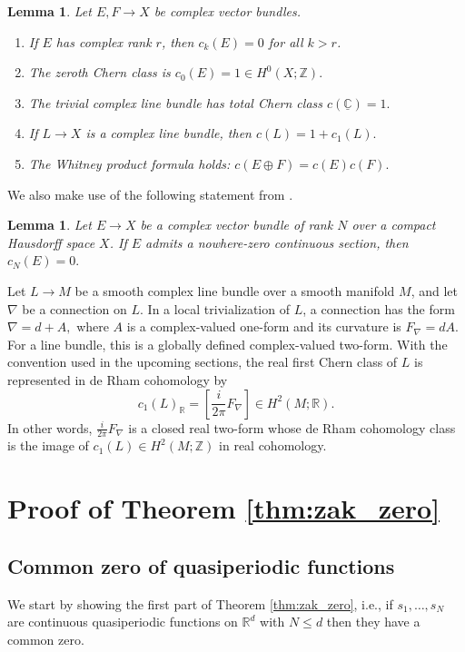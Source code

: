\documentclass[reqno,a4paper,12pt]{amsart}
\numberwithin{equation}{section}
\newtheorem{lemma}[definition]{Lemma}
\def\R{{\mathbb R}}
\newcommand{\Rd}{{\R^d}}
\newcommand\1{\mathds{1}}
\begin{document}
\begin{lemma}
Let $E,F\to X$ be complex vector bundles.
\begin{enumerate}
    \item If $E$ has complex rank $r$, then
    $
    c_k(E)=0
    $
    for all $k > r$.

    \item The zeroth Chern class is
    $
    c_0(E)=1\in H^0(X;\mathbb Z).
    $
    \item The trivial complex line bundle has total Chern class
    $
    c(\underline{\mathbb C})=1.
    $
    \item If $L\to X$ is a complex line bundle, then
    $
    c(L)=1+c_1(L).
    $
    \item The Whitney product formula holds:
    $
    c(E\oplus F)=c(E)c(F).
    $
\end{enumerate}
\end{lemma}

We also make use of the following statement from \cite{milnor1974characteristic}.

\begin{lemma}
Let $E\to X$ be a complex vector bundle of rank $N$ over a compact Hausdorff
space $X$. If $E$ admits a nowhere-zero continuous section, then
$
c_N(E)=0.
$
\end{lemma}

Let $L\to M$ be a smooth complex line bundle over a smooth manifold $M$, and let $\nabla$ be a connection on $L$.
In a local trivialization of $L$, a connection has the form
$
\nabla=d+A,
$
where $A$ is a complex-valued one-form and its curvature is
$
F_\nabla=dA.
$
For a line bundle, this is a globally defined complex-valued two-form.
With the convention used in the upcoming sections, the real first Chern class of $L$ is
represented in de Rham cohomology by
$$
c_1(L)_{\mathbb R}
=
\left[\frac{i}{2\pi}F_\nabla\right]
\in H^2(M;\mathbb R).
$$
In other words,
$
\frac{i}{2\pi}F_\nabla
$
is a closed real two-form whose de Rham cohomology class is the image of
$c_1(L)\in H^2(M;\mathbb Z)$ in real cohomology.


\section{Proof of Theorem \ref{thm:zak_zero}}\label{sec:zak_zero}

\subsection{Common zero of quasiperiodic functions}
We start by showing the first part of Theorem \ref{thm:zak_zero}, i.e., if $s_1,\dots,s_N$ are continuous quasiperiodic functions on $\Rd$ with $N \leq d$ then they have a common zero.
\end{document}
